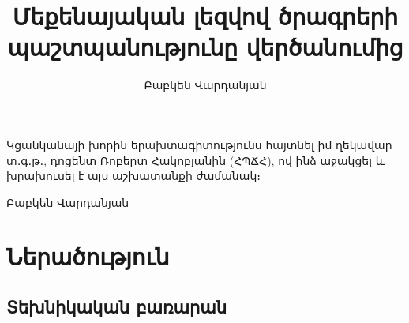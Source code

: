 \documentclass[12pt]{article}
\author{Բաբկեն Վարդանյան}
\title{Մեքենայական լեզվով ծրագրերի պաշտպանությունը վերծանումից}
\begin{document}
\setcounter{page}{5}
Կցանկանայի խորին երախտագիտությունս հայտնել իմ ղեկավար տ․գ․թ․, դոցենտ
Ռոբերտ Հակոբյանին (ՀՊՃՀ), ով ինձ աջակցել և խրախուսել է այս աշխատանքի
ժամանակ։

\hfill \hfill Բաբկեն Վարդանյան

\newpage

\tableofcontents

\newpage
\section{Ներածություն}
\begin{sloppypar}
\subsection{Տեխնիկական բառարան}


\end{sloppypar}
\end{document}
